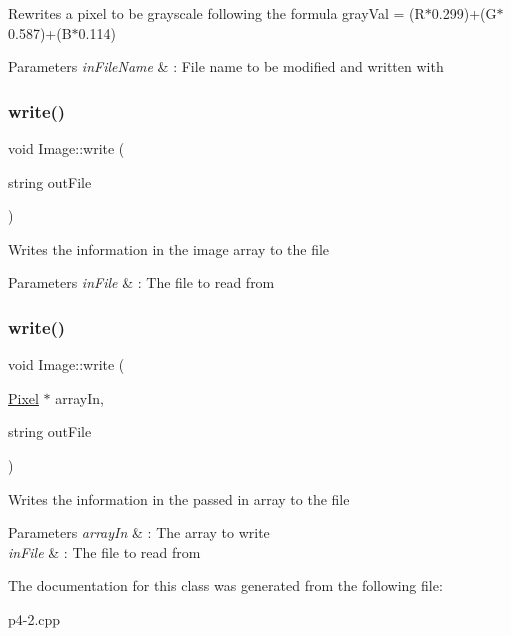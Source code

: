 Rewrites a pixel to be grayscale following the formula gray\+Val = (R$\ast$0.299)+(G$\ast$0.587)+(B$\ast$0.114) 
\begin{DoxyParams}{Parameters}
{\em in\+File\+Name} & \+: File name to be modified and written with \\
\hline
\end{DoxyParams}
\mbox{\label{classImage_a6622902de36f98f373d87d12788fcaf8}} 
\subsubsection{\texorpdfstring{write()}{write()}\hspace{0.1cm}{\footnotesize\ttfamily [1/2]}}
{\footnotesize\ttfamily void Image\+::write (\begin{DoxyParamCaption}\item[{string}]{out\+File }\end{DoxyParamCaption})}

Writes the information in the image array to the file 
\begin{DoxyParams}{Parameters}
{\em in\+File} & \+: The file to read from \\
\hline
\end{DoxyParams}
\mbox{\label{classImage_ab71d5ac51f8e210d16a93b4fa34c40ed}} 
\subsubsection{\texorpdfstring{write()}{write()}\hspace{0.1cm}{\footnotesize\ttfamily [2/2]}}
{\footnotesize\ttfamily void Image\+::write (\begin{DoxyParamCaption}\item[{\hyperlink{structPixel}{Pixel} $\ast$}]{array\+In,  }\item[{string}]{out\+File }\end{DoxyParamCaption})}

Writes the information in the passed in array to the file 
\begin{DoxyParams}{Parameters}
{\em array\+In} & \+: The array to write \\
\hline
{\em in\+File} & \+: The file to read from \\
\hline
\end{DoxyParams}


The documentation for this class was generated from the following file\+:\begin{DoxyCompactItemize}
\item 
p4-\/2.\+cpp\end{DoxyCompactItemize}
